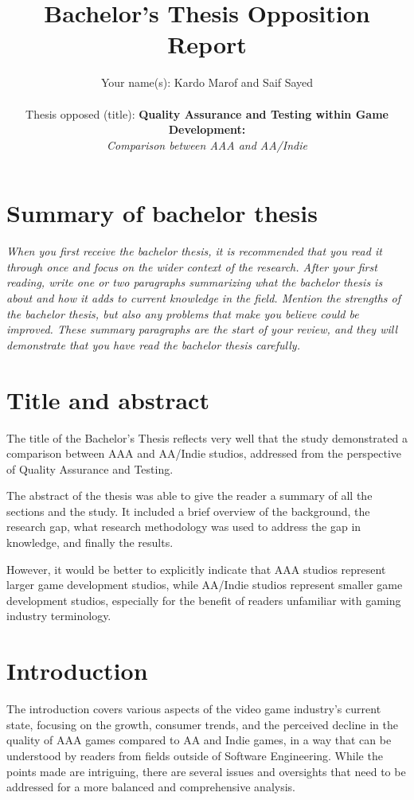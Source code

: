 \documentclass[conference]{IEEEtran}
\begin{document}
\title{Bachelor's Thesis Opposition Report}

\author{Your name(s):  Kardo Marof and Saif Sayed\\ \\
Thesis opposed (title): \textbf{Quality Assurance and Testing within Game Development:} \\
			       \quad\textit{Comparison between AAA and AA/Indie}
}

\maketitle


\section{Summary of bachelor thesis}
\textit{When you first receive the bachelor thesis, it is recommended that you read it through once and focus on the wider context of the research. After your first reading, write one or two paragraphs summarizing what the bachelor thesis is about and how it adds to current knowledge in the field. Mention the strengths of the bachelor thesis, but also any problems that make you believe could be improved. These summary paragraphs are the start of your review, and they will demonstrate that you have read the bachelor thesis carefully.}

\section{Title and abstract}
The title of the Bachelor's Thesis reflects very well that the study demonstrated a comparison between AAA and AA/Indie studios, addressed from the perspective of Quality Assurance and Testing.

The abstract of the thesis was able to give the reader a summary of all the sections and the study. It included a brief overview of the background, the research gap, what research methodology was used to address the gap in knowledge, and finally the results.

However, it would be better to explicitly indicate that AAA studios represent larger game development studios, while AA/Indie studios represent smaller game development studios, especially for the benefit of readers unfamiliar with gaming industry terminology.


\section{Introduction}
The introduction covers various aspects of the video game industry's current state, focusing on the growth, consumer trends, and the perceived decline in the quality of AAA games compared to AA and Indie games, in a way that can be understood by readers from fields outside of Software Engineering. While the points made are intriguing, there are several issues and oversights that need to be addressed for a more balanced and comprehensive analysis.
\end{document}
